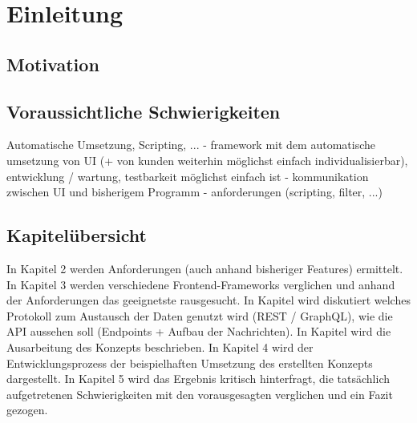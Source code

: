 \chapter{Einleitung}


\section{Motivation}

\section{Voraussichtliche Schwierigkeiten}
Automatische Umsetzung, Scripting, ...
- framework mit dem automatische umsetzung von UI (+ von kunden weiterhin möglichst einfach individualisierbar), entwicklung / wartung, testbarkeit möglichst einfach ist
- kommunikation zwischen UI und bisherigem Programm
- anforderungen (scripting, filter, ...)

\section{Kapitelübersicht}
In Kapitel 2  werden Anforderungen (auch anhand bisheriger Features) ermittelt.
In Kapitel 3  werden verschiedene Frontend-Frameworks verglichen und anhand der Anforderungen das geeignetste rausgesucht.
In Kapitel  wird diskutiert welches Protokoll zum Austausch der Daten genutzt wird (REST / GraphQL), wie die API aussehen soll (Endpoints + Aufbau der Nachrichten).
In Kapitel  wird die Ausarbeitung des Konzepts beschrieben.
In Kapitel 4  wird der Entwicklungsprozess der beispielhaften Umsetzung des erstellten Konzepts dargestellt.
In Kapitel 5  wird das Ergebnis kritisch hinterfragt, die tatsächlich aufgetretenen Schwierigkeiten mit den vorausgesagten verglichen und ein Fazit gezogen.
